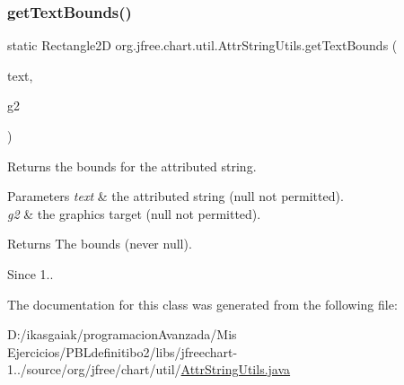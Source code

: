 \subsubsection{\texorpdfstring{get\+Text\+Bounds()}{getTextBounds()}}
{\footnotesize\ttfamily static Rectangle2D org.\+jfree.\+chart.\+util.\+Attr\+String\+Utils.\+get\+Text\+Bounds (\begin{DoxyParamCaption}\item[{Attributed\+String}]{text,  }\item[{Graphics2D}]{g2 }\end{DoxyParamCaption})\hspace{0.3cm}{\ttfamily [static]}}

Returns the bounds for the attributed string.


\begin{DoxyParams}{Parameters}
{\em text} & the attributed string ({\ttfamily null} not permitted). \\
\hline
{\em g2} & the graphics target ({\ttfamily null} not permitted).\\
\hline
\end{DoxyParams}
\begin{DoxyReturn}{Returns}
The bounds (never {\ttfamily null}).
\end{DoxyReturn}
\begin{DoxySince}{Since}
1.. 
\end{DoxySince}


The documentation for this class was generated from the following file\+:\begin{DoxyCompactItemize}
\item 
D\+:/ikasgaiak/programacion\+Avanzada/\+Mis Ejercicios/\+P\+B\+Ldefinitibo2/libs/jfreechart-\/1../source/org/jfree/chart/util/\mbox{\hyperlink{_attr_string_utils_8java}{Attr\+String\+Utils.\+java}}\end{DoxyCompactItemize}

